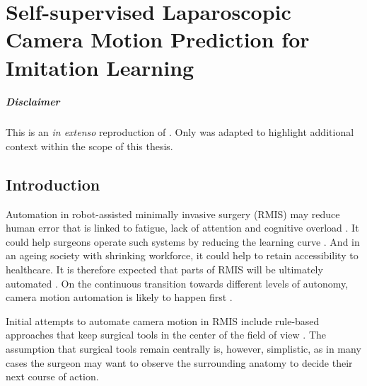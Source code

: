\graphicspath{{chapter_4}}
\chapter[Self-supervised Laparoscopic Camera Motion Prediction]{Self-supervised Laparoscopic Camera Motion Prediction for Imitation Learning}
\label{chap:camera_motion_prediction}
\minitoc

\paragraph{Disclaimer} This  is an \textit{in extenso} reproduction of \cite{huber2023deep}. Only  was adapted to highlight additional context within the scope of this thesis.

\newpage

\section{Introduction}
\label{c4:sec:introduction}
Automation in robot-assisted minimally invasive surgery (RMIS) may reduce human error that is linked to fatigue, lack of attention and cognitive overload \cite{fiorini2022concepts}.
It could help surgeons operate such systems by reducing the learning curve \cite{van2018learning}.
And in an ageing society with shrinking workforce, it could help to retain accessibility to healthcare. It is therefore expected that parts of RMIS will be ultimately automated \cite{davenport2019potential,zidane2022robotics}. On the continuous transition towards different levels of autonomy, camera motion automation is likely to happen first \cite{kitaguchi2022artificial}.

Initial attempts to automate camera motion in RMIS include rule-based approaches that keep surgical tools in the center of the field of view \cite{da2020scan,garcia2022robotic,sandoval2021towards}. The assumption that surgical tools remain centrally is, however, simplistic, as in many cases the surgeon may want to observe the surrounding anatomy to decide their next course of action. 

